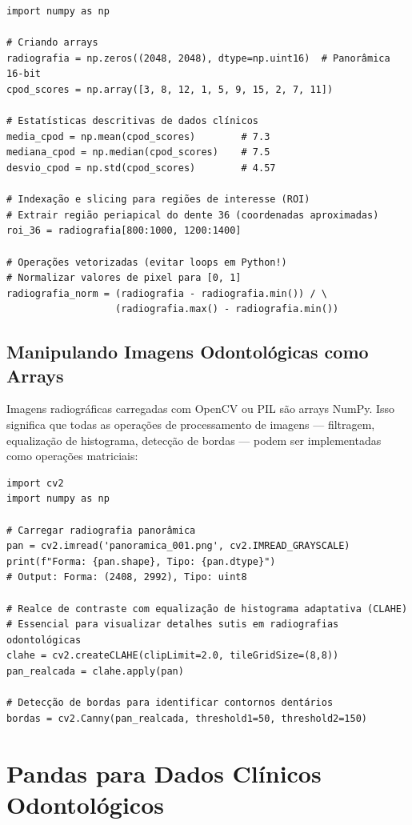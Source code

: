 \begin{verbatim}
import numpy as np

# Criando arrays
radiografia = np.zeros((2048, 2048), dtype=np.uint16)  # Panorâmica 16-bit
cpod_scores = np.array([3, 8, 12, 1, 5, 9, 15, 2, 7, 11])

# Estatísticas descritivas de dados clínicos
media_cpod = np.mean(cpod_scores)        # 7.3
mediana_cpod = np.median(cpod_scores)    # 7.5
desvio_cpod = np.std(cpod_scores)        # 4.57

# Indexação e slicing para regiões de interesse (ROI)
# Extrair região periapical do dente 36 (coordenadas aproximadas)
roi_36 = radiografia[800:1000, 1200:1400]

# Operações vetorizadas (evitar loops em Python!)
# Normalizar valores de pixel para [0, 1]
radiografia_norm = (radiografia - radiografia.min()) / \
                   (radiografia.max() - radiografia.min())
\end{verbatim}

\subsection{Manipulando Imagens Odontológicas como Arrays}

Imagens radiográficas carregadas com OpenCV ou PIL são arrays NumPy. Isso significa que todas as operações de processamento de imagens — filtragem, equalização de histograma, detecção de bordas — podem ser implementadas como operações matriciais:

\begin{verbatim}
import cv2
import numpy as np

# Carregar radiografia panorâmica
pan = cv2.imread('panoramica_001.png', cv2.IMREAD_GRAYSCALE)
print(f"Forma: {pan.shape}, Tipo: {pan.dtype}")
# Output: Forma: (2408, 2992), Tipo: uint8

# Realce de contraste com equalização de histograma adaptativa (CLAHE)
# Essencial para visualizar detalhes sutis em radiografias odontológicas
clahe = cv2.createCLAHE(clipLimit=2.0, tileGridSize=(8,8))
pan_realcada = clahe.apply(pan)

# Detecção de bordas para identificar contornos dentários
bordas = cv2.Canny(pan_realcada, threshold1=50, threshold2=150)
\end{verbatim}

\section{Pandas para Dados Clínicos Odontológicos}

